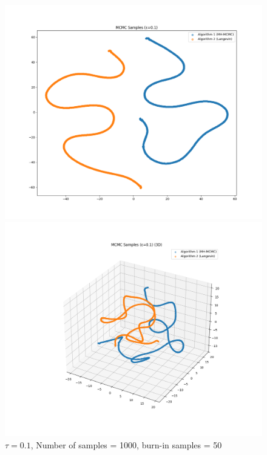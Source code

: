 \documentclass[a4paper,12pt]{article}
\begin{document}
\begin{figure}[H]
  \centering
  \begin{minipage}{0.38\textwidth}
    \includegraphics[width=\linewidth]{TASK-0-1/images/samples_eps0.1_n1000_burn50_tsne_2d.png}
  \end{minipage}
  \hfill
  \begin{minipage}{0.38\textwidth}
    \includegraphics[width=\linewidth]{TASK-0-1/images/samples_eps0.1_n1000_burn50_tsne_3d.png}
  \end{minipage}
  \caption{$\tau = 0.1$, Number of samples = 1000, burn-in samples = 50}
\end{figure}
\end{document}
